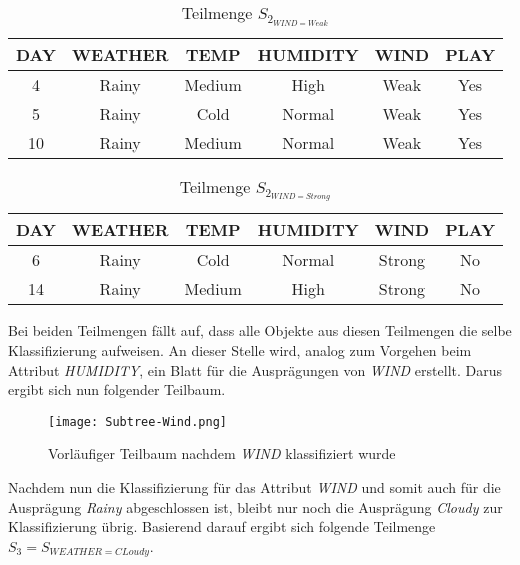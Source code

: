\begin{table}[H]
    \centering
    \begin{tabular}{cccccc}
        \toprule
        \textbf{DAY} & \textbf{WEATHER} & \textbf{TEMP} & \textbf{HUMIDITY} & \textbf{WIND} & \textbf{PLAY} \\
        \toprule
        4   &Rainy	&Medium	&High	&Weak	&Yes \\
        5   &Rainy	&Cold	&Normal	&Weak	&Yes \\
        10  &Rainy	&Medium	&Normal	&Weak	&Yes \\
        \bottomrule
    \end{tabular}
    \caption{Teilmenge $S_{2_{WIND=Weak}}$}
    \label{table:datensatz-wind-weak}
\end{table}

\begin{table}[H]
    \centering
    \begin{tabular}{cccccc}
        \toprule
        \textbf{DAY} & \textbf{WEATHER} & \textbf{TEMP} & \textbf{HUMIDITY} & \textbf{WIND} & \textbf{PLAY} \\
        \toprule
        6   &Rainy	&Cold	&Normal	&Strong	&No  \\
        14  &Rainy	&Medium	&High	&Strong	&No  \\
        \bottomrule
    \end{tabular}
    \caption{Teilmenge $S_{2_{WIND=Strong}}$}
    \label{table:datensatz-wind-strong}
\end{table}

Bei beiden Teilmengen fällt auf, dass alle Objekte aus diesen Teilmengen die selbe Klassifizierung aufweisen. An dieser Stelle wird, analog zum Vorgehen beim Attribut \textit{HUMIDITY}, ein Blatt für die Ausprägungen von \textit{WIND} erstellt. Darus ergibt sich nun folgender Teilbaum.

\begin{figure}[htbp]
    \centering
    \texttt{[image: Subtree-Wind.png]}
    \caption{Vorläufiger Teilbaum nachdem \textit{WIND} klassifiziert wurde}
\end{figure}

Nachdem nun die Klassifizierung für das Attribut \textit{WIND} und somit auch für die Ausprägung \textit{Rainy} abgeschlossen ist, bleibt nur noch die Ausprägung \textit{Cloudy} zur Klassifizierung übrig. Basierend darauf ergibt sich folgende Teilmenge $S_{3} = S_{WEATHER=CLoudy}$.

